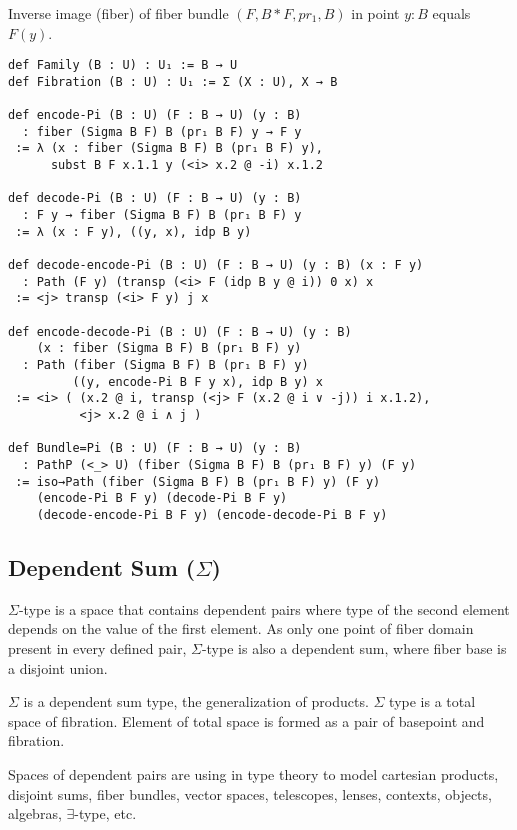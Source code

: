 \documentclass{article}
\begin{document}
\begin{theorem}
Inverse image (fiber) of fiber bundle $(F,B*F,pr_1,B)$ in point $y:B$ equals $F(y)$.
\begin{lstlisting}[mathescape=true]
def Family (B : U) : U₁ := B → U
def Fibration (B : U) : U₁ := Σ (X : U), X → B

def encode-Pi (B : U) (F : B → U) (y : B)
  : fiber (Sigma B F) B (pr₁ B F) y → F y
 := λ (x : fiber (Sigma B F) B (pr₁ B F) y),
      subst B F x.1.1 y (<i> x.2 @ -i) x.1.2

def decode-Pi (B : U) (F : B → U) (y : B)
  : F y → fiber (Sigma B F) B (pr₁ B F) y
 := λ (x : F y), ((y, x), idp B y)

def decode-encode-Pi (B : U) (F : B → U) (y : B) (x : F y)
  : Path (F y) (transp (<i> F (idp B y @ i)) 0 x) x
 := <j> transp (<i> F y) j x

def encode-decode-Pi (B : U) (F : B → U) (y : B)
    (x : fiber (Sigma B F) B (pr₁ B F) y)
  : Path (fiber (Sigma B F) B (pr₁ B F) y)
         ((y, encode-Pi B F y x), idp B y) x
 := <i> ( (x.2 @ i, transp (<j> F (x.2 @ i ∨ -j)) i x.1.2),
          <j> x.2 @ i ∧ j )

def Bundle=Pi (B : U) (F : B → U) (y : B)
  : PathP (<_> U) (fiber (Sigma B F) B (pr₁ B F) y) (F y)
 := iso→Path (fiber (Sigma B F) B (pr₁ B F) y) (F y)
    (encode-Pi B F y) (decode-Pi B F y)
    (decode-encode-Pi B F y) (encode-decode-Pi B F y)
\end{lstlisting}
\end{theorem}

\subsection{Dependent Sum ($\Sigma$)}
$\Sigma$-type is a space that contains dependent pairs
where type of the second element depends on the value
of the first element. As only one point of fiber domain
present in every defined pair, $\Sigma$-type is also a dependent sum,
where fiber base is a disjoint union.

$\Sigma$ is a dependent sum type, the generalization of products.
$\Sigma$ type is a total space of fibration. Element of total
space is formed as a pair of basepoint and fibration.

Spaces of dependent pairs are using in type theory to model
cartesian products, disjoint sums, fiber bundles, vector spaces,
telescopes, lenses, contexts, objects, algebras, $\exists$-type, etc.
\end{document}
